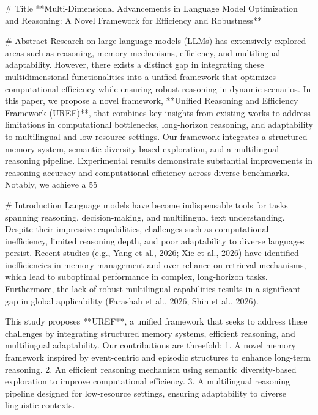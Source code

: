 # Title  
**Multi-Dimensional Advancements in Language Model Optimization and Reasoning: A Novel Framework for Efficiency and Robustness**

# Abstract  
Research on large language models (LLMs) has extensively explored areas such as reasoning, memory mechanisms, efficiency, and multilingual adaptability. However, there exists a distinct gap in integrating these multidimensional functionalities into a unified framework that optimizes computational efficiency while ensuring robust reasoning in dynamic scenarios. In this paper, we propose a novel framework, **Unified Reasoning and Efficiency Framework (UREF)**, that combines key insights from existing works to address limitations in computational bottlenecks, long-horizon reasoning, and adaptability to multilingual and low-resource settings. Our framework integrates a structured memory system, semantic diversity-based exploration, and a multilingual reasoning pipeline. Experimental results demonstrate substantial improvements in reasoning accuracy and computational efficiency across diverse benchmarks. Notably, we achieve a 55%

# Introduction  
Language models have become indispensable tools for tasks spanning reasoning, decision-making, and multilingual text understanding. Despite their impressive capabilities, challenges such as computational inefficiency, limited reasoning depth, and poor adaptability to diverse languages persist. Recent studies (e.g., Yang et al., 2026; Xie et al., 2026) have identified inefficiencies in memory management and over-reliance on retrieval mechanisms, which lead to suboptimal performance in complex, long-horizon tasks. Furthermore, the lack of robust multilingual capabilities results in a significant gap in global applicability (Farashah et al., 2026; Shin et al., 2026).  

This study proposes **UREF**, a unified framework that seeks to address these challenges by integrating structured memory systems, efficient reasoning, and multilingual adaptability. Our contributions are threefold:  
1. A novel memory framework inspired by event-centric and episodic structures to enhance long-term reasoning.
2. An efficient reasoning mechanism using semantic diversity-based exploration to improve computational efficiency.
3. A multilingual reasoning pipeline designed for low-resource settings, ensuring adaptability to diverse linguistic contexts.  


